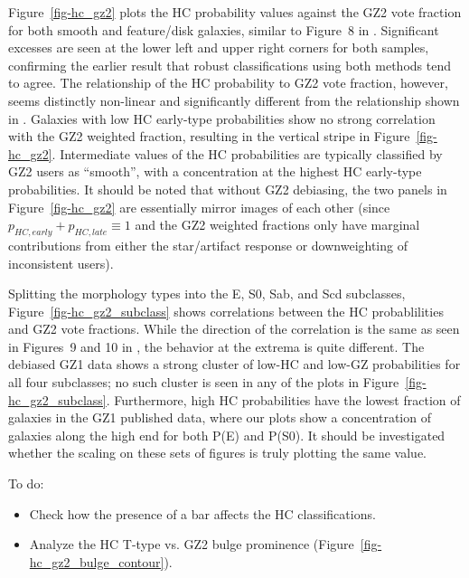 \documentclass[useAMS,usenatbib]{mn2e}
\begin{document}
Figure~\ref{fig-hc_gz2} plots the HC probability values against the GZ2 vote fraction for both smooth and feature/disk galaxies, similar to Figure~8 in \citet{hue11}. Significant excesses are seen at the lower left and upper right corners for both samples, confirming the earlier result that robust classifications using both methods tend to agree. The relationship of the HC probability to GZ2 vote fraction, however, seems distinctly non-linear and significantly different from the relationship shown in \citet{hue11}. Galaxies with low HC early-type probabilities show no strong correlation with the GZ2 weighted fraction, resulting in the vertical stripe in Figure~\ref{fig-hc_gz2}. Intermediate values of the HC probabilities are typically classified by GZ2 users as ``smooth'', with a concentration at the highest HC early-type probabilities. It should be noted that without GZ2 debiasing, the two panels in Figure~\ref{fig-hc_gz2} are essentially mirror images of each other (since $p_{HC,early} + p_{HC,late} \equiv 1$ and the GZ2 weighted fractions only have marginal contributions from either the star/artifact response or downweighting of inconsistent users). 

Splitting the morphology types into the E, S0, Sab, and Scd subclasses, Figure~\ref{fig-hc_gz2_subclass} shows correlations between the HC probablilities and GZ2 vote fractions. While the direction of the correlation is the same as seen in Figures~9 and 10 in \citet{hue11}, the behavior at the extrema is quite different. The debiased GZ1 data shows a strong cluster of low-HC and low-GZ probabilities for all four subclasses; no such cluster is seen in any of the plots in Figure~\ref{fig-hc_gz2_subclass}. Furthermore, high HC probabilities have the lowest fraction of galaxies in the GZ1 published data, where our plots show a concentration of galaxies along the high end for both P(E) and P(S0). It should be investigated whether the scaling on these sets of figures is truly plotting the same value. 

To do:
\begin{itemize}
	\item Check how the presence of a bar affects the HC classifications.
	\item Analyze the HC T-type vs. GZ2 bulge prominence (Figure~\ref{fig-hc_gz2_bulge_contour}).
\end{itemize}
\end{document}
